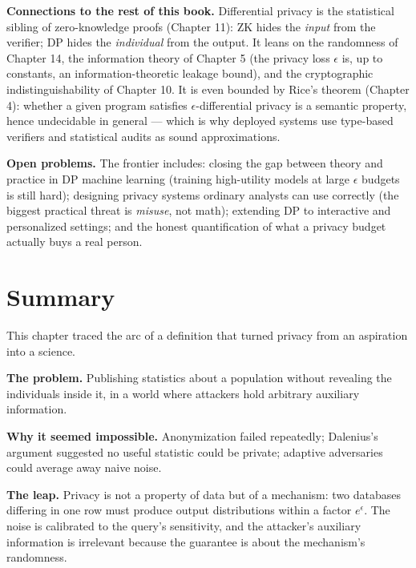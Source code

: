 \textbf{Connections to the rest of this book.} Differential privacy is the statistical sibling of zero-knowledge proofs (Chapter 11): ZK hides the \emph{input} from the verifier; DP hides the \emph{individual} from the output. It leans on the randomness of Chapter 14, the information theory of Chapter 5 (the privacy loss $\epsilon$ is, up to constants, an information-theoretic leakage bound), and the cryptographic indistinguishability of Chapter 10. It is even bounded by Rice's theorem (Chapter 4): whether a given program satisfies $\epsilon$-differential privacy is a semantic property, hence undecidable in general --- which is why deployed systems use type-based verifiers and statistical audits as sound approximations. 

\textbf{Open problems.} The frontier includes: closing the gap between theory and practice in DP machine learning (training high-utility models at large $\epsilon$ budgets is still hard); designing privacy systems ordinary analysts can use correctly (the biggest practical threat is \emph{misuse}, not math); extending DP to interactive and personalized settings; and the honest quantification of what a privacy budget actually buys a real person.

\section{Summary}
\label{sec:dp:summary}

This chapter traced the arc of a definition that turned privacy from an aspiration into a science. 

\textbf{The problem.} Publishing statistics about a population without revealing the individuals inside it, in a world where attackers hold arbitrary auxiliary information.

\textbf{Why it seemed impossible.} Anonymization failed repeatedly; Dalenius's argument suggested no useful statistic could be private; adaptive adversaries could average away naive noise.

\textbf{The leap.} Privacy is not a property of data but of a mechanism: two databases differing in one row must produce output distributions within a factor $e^{\epsilon}$. The noise is calibrated to the query's sensitivity, and the attacker's auxiliary information is irrelevant because the guarantee is about the mechanism's randomness.

